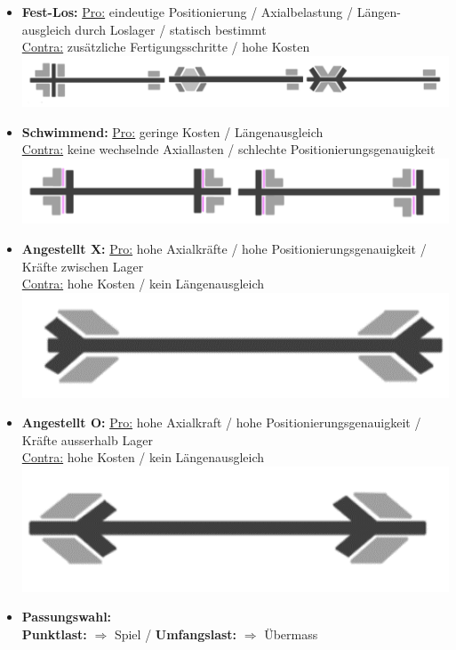 \begin{scriptsize}
    \begin{itemize}
        \item \textbf{Fest-Los:} \underline{Pro:} eindeutige Positionierung / Axialbelastung / Längen-\\ausgleich durch Loslager / statisch bestimmt
        \\ \underline{Contra:} zusätzliche Fertigungsschritte / hohe Kosten
        \\\includegraphics[width = 0.9\linewidth]{src/images/Fest_Loslager.png}
        \item \textbf{Schwimmend:} \underline{Pro:} geringe Kosten / Längenausgleich
        \\ \underline{Contra:} keine wechselnde Axiallasten / schlechte Positionierungsgenauigkeit
        \\\includegraphics[width = 0.6\linewidth]{src/images/Schwimmende_Lagerung.png}
        \item \textbf{Angestellt X:} \underline{Pro:} hohe Axialkräfte / hohe Positionierungsgenauigkeit / Kräfte zwischen Lager 
        \\ \underline{Contra:} hohe Kosten / kein Längenausgleich
        \\\includegraphics[width = 0.3\linewidth]{src/images/Angestellt X.png}
        \item \textbf{Angestellt O:} \underline{Pro:} hohe Axialkraft / hohe Positionierungsgenauigkeit / Kräfte ausserhalb Lager
        \\ \underline{Contra:} hohe Kosten / kein Längenausgleich
        \\\includegraphics[width = 0.3\linewidth]{src/images/Angestellt O.png}
        \item \textbf{Passungswahl:} 
        \\ \textbf{Punktlast:} $\Rightarrow$ Spiel / \textbf{Umfangslast:} $\Rightarrow$ Übermass 
    \end{itemize} 
\end{scriptsize}